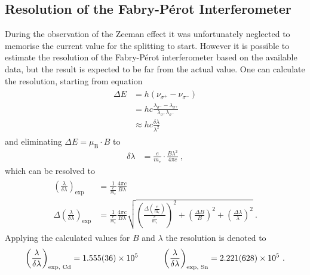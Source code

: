 \subsection{Resolution of the Fabry-P\'erot Interferometer}
\label{toc:ResolutionFPI}
During the observation of the Zeeman effect it was unfortunately neglected to memorise the current value for the splitting to start. 
However it is possible to estimate the resolution of the Fabry-P\'erot interferometer based on the available data, but the result is expected to be far from the actual value.
One can calculate the resolution, starting from equation
\begin{align}
	\begin{split}
	\Delta E	&= h (\nu_{\sigma^+} - \nu_{\sigma^-})\\
			&= h c \frac{\lambda_{\sigma^-}-\lambda_{\sigma^+}}{\lambda_{\sigma^+}\lambda_{\sigma^-}}\\
			&\approx hc \frac{\delta\lambda}{\lambda^2}
	\end{split}
\end{align}
and eliminating $\Delta E = \mu_{\text{B}} \cdot B$ to
\begin{align}
	\delta\lambda	&= \frac{e}{m_e}\cdot\frac{B\lambda^2}{4\pi c}\ ,
\end{align}
which can be resolved to
	\begin{align}
	\begin{split}
	\left(\frac{\lambda}{\delta\lambda}\right)_{\text{exp}}		&= \frac{1}{\frac{e}{m_e}}\frac{4\pi c}{B \lambda}\\
	\Delta\left(\frac{\lambda}{\delta\lambda}\right)_{\text{exp}} 	&= \frac{1}{\frac{e}{m_e}}\frac{4\pi c}{B \lambda}\sqrt{\left(\frac{\Delta \left(\frac{e}{m_e}\right)}{\frac{e}{m_e}}\right)^2 + \left(\frac{\Delta B}{B}\right)^2 +\left(\frac{\Delta \lambda}{\lambda}\right)^2}\ .
	\end{split}
	\end{align}
Applying the calculated values for $B$ and $\lambda$ the resolution is denoted to
	\begin{align}
	\left(\frac{\lambda}{\delta\lambda}\right)_{\text{exp, Cd}} = \num{1.555 \pm 0.036 e5} \hspace{1.0cm} \left(\frac{\lambda}{\delta\lambda}\right)_{\text{exp, Sn}} = \num{2.221 \pm 0.628 e5}\ .
	\end{align}
